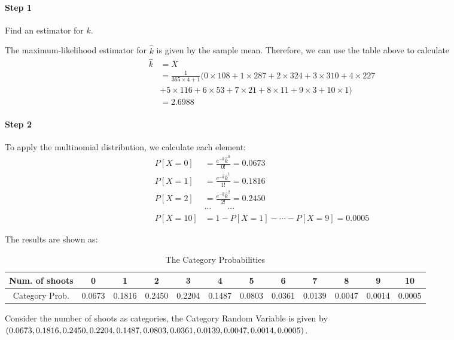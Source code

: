 \documentclass[a4paper]{article}
\begin{document}
\paragraph{Step 1} Find an estimator for $k$.

The maximum-likelihood estimator for $\widehat{k}$ is given by the sample mean. Therefore, we can use the table above to calculate
\begin{align*}
\widehat{k}
&=\overline{X}\\
&=\displaystyle\frac{1}{365\times 4+1}(0 \times 108 + 1 \times 287 + 2 \times 324 + 3 \times 310 + 4 \times 227\\
&+ 5 \times 116 + 6 \times 53 + 7 \times 21 + 8 \times 11 + 9 \times 3 + 10 \times 1)\\
&= 2.6988
\end{align*}

\paragraph{Step 2} To apply the multinomial distribution, we calculate each element:
\begin{align*}
P[X=0] &=\displaystyle\frac{e^{-\widehat{k}}\widehat{k}^0}{0!}=0.0673\\
P[X=1] &=\displaystyle\frac{e^{-\widehat{k}}\widehat{k}^1}{1!}=0.1816\\
P[X=2] &=\displaystyle\frac{e^{-\widehat{k}}\widehat{k}^2}{2!}=0.2450\\
&\cdots \qquad \cdots\\
P[X=10] &=1-P[X=1]-\cdots-P[X=9]=0.0005
\end{align*}

The results are shown as:
\begin{table}[!htbp]
  \centering
    \begin{tabular}{cccccccccccc}
    \hline
    Num. of shoots & 0     & 1     & 2     & 3     & 4     & 5     & 6     & 7     & 8     & 9     & 10 \\
    \hline
    Category Prob. & 0.0673  & 0.1816  & 0.2450  & 0.2204  & 0.1487  & 0.0803  & 0.0361  & 0.0139  & 0.0047  & 0.0014  & 0.0005  \\
    \hline
    \end{tabular}%
    \caption{The Category Probabilities}
\end{table}%

Consider the number of shoots as categories, the Category Random Variable is given by $(0.0673,0.1816,0.2450,\\0.2204,0.1487,0.0803,0.0361,0.0139,0.0047,0.0014,0.0005)$. 
\end{document}
